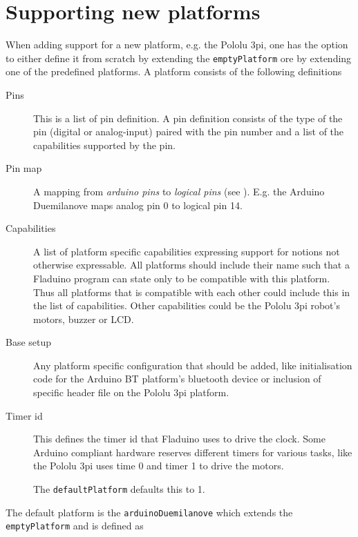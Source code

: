 \documentclass[a4paper, oneside, final]{memoir}
\let\Fref\undefined
\begin{document}
\section{Supporting  new platforms}

When adding support for a new platform, e.g. the Pololu 3pi, one has the option
to either define it from scratch by extending the \texttt{emptyPlatform} ore by
extending one of the predefined platforms. A platform consists of the following
definitions

\begin{description}
\item[Pins] This is a list of pin definition. A pin definition
  consists of the type of the pin (digital or analog-input) paired
  with the pin number and a list of the capabilities supported by the
  pin.

\item[Pin map] A mapping from \textit{arduino pins} to
  \textit{logical pins} (see \Fref{sec:pins}).  E.g. the Arduino
  Duemilanove maps analog pin 0 to logical pin 14.

\item[Capabilities] A list of platform specific capabilities
  expressing support for notions not otherwise expressable.  All
  platforms should include their name such that a Fladuino program can
  state only to be compatible with this platform. Thus all platforms
  that is compatible with each other could include this in the list of
  capabilities. Other capabilities could be the Pololu 3pi robot's
  motors, buzzer or LCD.

\item[Base setup] Any platform specific configuration that should be
  added, like initialisation code for the Arduino BT platform's
  bluetooth device or inclusion of specific header file on the Pololu
  3pi platform.

\item[Timer id] This defines the timer id that Fladuino uses to drive
  the clock. Some Arduino compliant hardware reserves different timers
  for various tasks, like the Pololu 3pi uses time 0 and timer 1 to
  drive the motors.

  The \texttt{defaultPlatform} defaults this to 1.
\end{description}

The default platform is the \texttt{arduinoDuemilanove} which extends the
\texttt{emptyPlatform} and is defined as
\end{document}
